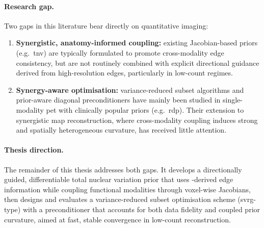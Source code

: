 \paragraph{Research gap.}
Two gaps in this literature bear directly on quantitative  imaging:
\begin{enumerate}
    \item \textbf{Synergistic, anatomy-informed coupling:} existing Jacobian-based priors (e.g.\ \gls{tnv}) are typically formulated to promote cross-modality edge consistency, but are not routinely combined with explicit directional guidance derived from high-resolution  edges, particularly in low-count regimes.
    \item \textbf{Synergy-aware optimisation:} variance-reduced subset algorithms and prior-aware diagonal preconditioners have mainly been studied in single-modality \gls{pet} with clinically popular priors (e.g.\ \gls{rdp}). Their extension to synergistic \gls{map} reconstruction, where cross-modality coupling induces strong and spatially heterogeneous curvature, has received little attention.
\end{enumerate}

\paragraph{Thesis direction.}
The remainder of this thesis addresses both gaps. It develops a directionally guided, differentiable total nuclear variation prior that uses -derived edge information while coupling functional modalities through voxel-wise Jacobians, then designs and evaluates a variance-reduced subset optimisation scheme (\gls{svrg}-type) with a preconditioner that accounts for both data fidelity and coupled prior curvature, aimed at fast, stable convergence in low-count  reconstruction.
